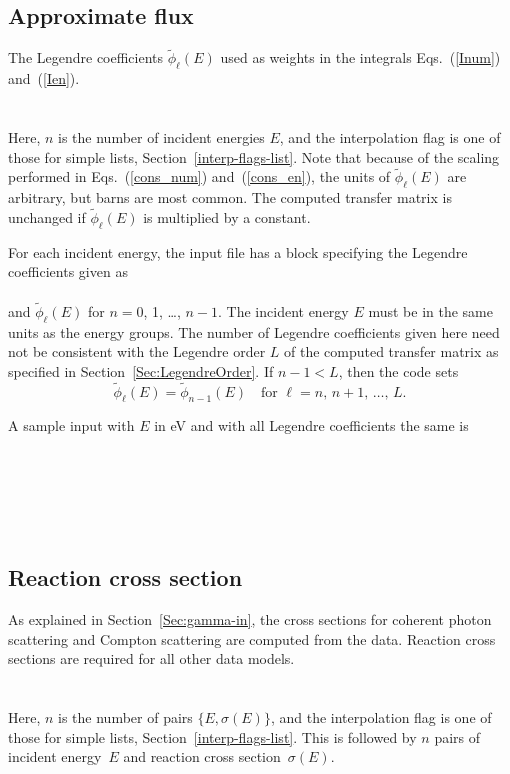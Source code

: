 \subsection{Approximate flux}
The Legendre coefficients $\widetilde \phi_\ell(E)$ used as weights in
the integrals Eqs.~(\ref{Inum}) and~(\ref{Ien}).\\
  \\
  \\
Here, $n$ is the number of incident energies $E$, and
the interpolation flag is one of those for simple lists, Section~\ref{interp-flags-list}.
Note that because of the scaling performed in Eqs.~(\ref{cons_num})
and~(\ref{cons_en}), the units of $\widetilde \phi_\ell(E)$
are arbitrary, but barns are most common.  The computed transfer matrix is unchanged if
$\widetilde \phi_\ell(E)$ is multiplied by a constant.

For each incident energy, the input file has a block specifying
the Legendre coefficients  given as\\
 \\
and $\widetilde \phi_\ell(E)$ for $n = 0$, 1, \ldots , $n - 1$.
The incident energy $E$ must be in the same units as the
energy groups.
The number of Legendre coefficients given here need not be
consistent with the Legendre order $L$ of the computed transfer
matrix as specified in Section~\ref{Sec:LegendreOrder}.  
If $n - 1 < L$, then the {\gettransfer} code sets
$$
  \widetilde \phi_\ell(E) = \widetilde \phi_{n - 1}(E)
  \quad \text{for $\ell = n$, $n+1$, \ldots, $L$.}
$$

A sample input with $E$ in eV and with all Legendre coefficients
the same is\\
  \\
  \\
  \\
  \\
  \\

\subsection{Reaction cross section}
As explained in Section~\ref{Sec:gamma-in}, the cross sections for coherent photon
scattering and Compton scattering are computed from the data.
Reaction cross sections are required for all other data models.\\
  \\
  \\
Here, $n$ is the number of pairs $\{E, \sigma(E)\}$,
and the interpolation flag is one of those for simple lists,
Section~\ref{interp-flags-list}.  This is
followed by $n$ pairs of incident energy~$E$ and reaction cross
section~$\sigma( E )$.

